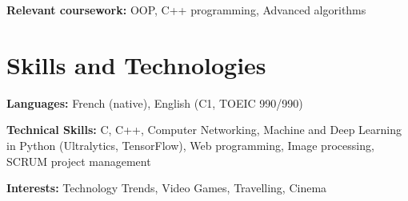         \begin{onecolentry}
            \begin{highlights}
                \item \textbf{Relevant coursework:} OOP, C++ programming, Advanced algorithms
            \end{highlights}
        \end{onecolentry}


    \section{Skills and Technologies}
        \begin{onecolentry}
            \textbf{Languages:} French (native), English (C1, TOEIC 990/990) 
        \end{onecolentry}

        \begin{onecolentry}
            \textbf{Technical Skills:} C, C++, Computer Networking, Machine and Deep Learning in Python (Ultralytics, TensorFlow), Web programming, Image processing, SCRUM project management
        \end{onecolentry}

        \begin{onecolentry}
            \textbf{Interests:} Technology Trends, Video Games, Travelling, Cinema
        \end{onecolentry}
